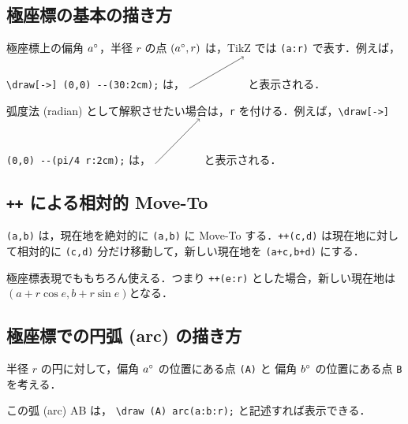 \documentclass[lualatex]{jlreq}
\begin{document}
\subsection{極座標の基本の描き方}

極座標上の偏角 \(\qty[parse-numbers=false]{a}{\degree} \)，半径 \(r \) の点 \((\qty[parse-numbers=false]{a}{\degree}, r)\) は，TikZ では \verb|(a:r)| で表す．例えば，\verb|\draw[->] (0,0) --(30:2cm);| は，
\(
\begin{tikzpicture}
    \draw[->] (0,0) --(30:2cm);
\end{tikzpicture}
\)
と表示される．

弧度法 (radian) として解釈させたい場合は，\verb|r| を付ける．例えば，\verb|\draw[->] (0,0) --(pi/4 r:2cm);| は，
\(
\begin{tikzpicture}
    \draw[->] (0,0) --(pi/4 r:2cm);
\end{tikzpicture}
\)
と表示される．

\subsection{\texttt{++} による相対的 Move-To}

\verb|(a,b)| は，現在地を絶対的に \verb|(a,b)| に Move-To する．\verb|++(c,d)| は現在地に対して相対的に \verb|(c,d)| 分だけ移動して，新しい現在地を \verb|(a+c,b+d)| にする．

極座標表現でももちろん使える．つまり \verb|++(e:r)| とした場合，新しい現在地は \((a+r \cos e, b+r \sin e) \)となる．

\subsection{極座標での円弧 (arc) の描き方}

半径 \(r \) の円に対して，偏角 \(\qty[parse-numbers=false]{a}{\degree}\) の位置にある点 \verb|(A)| と 偏角 \(\qty[parse-numbers=false]{b}{\degree}\) の位置にある点 \verb|B| を考える．

この弧 (arc) AB は， \verb|\draw (A) arc(a:b:r);| と記述すれば表示できる．
\end{document}
